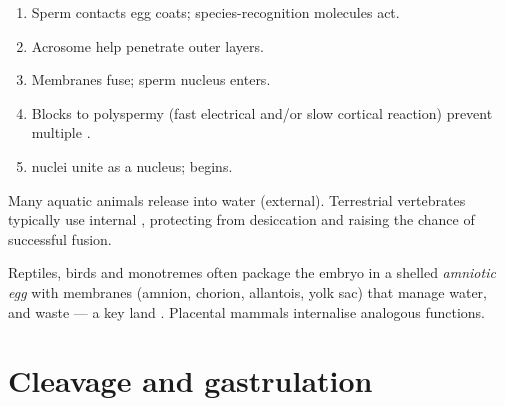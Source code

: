\begin{method}
\label{met:g12:reproduction-development:fert}
\begin{enumerate}
  \item Sperm contacts egg coats; species-recognition molecules act.
  \item Acrosome  help penetrate outer layers.
  \item Membranes fuse; sperm nucleus enters.
  \item Blocks to polyspermy (fast electrical and/or slow cortical
        reaction) prevent multiple .
  \item {} nuclei unite as a   nucleus;  begins.
\end{enumerate}
\end{method}

\begin{example}
\label{ex:g12:reproduction-development:internal}
Many aquatic animals release  into water (external). Terrestrial
vertebrates typically use internal , protecting  from
desiccation and raising the chance of successful fusion.
\end{example}

\begin{definition}
\label{def:g12:reproduction-development:amniote}
Reptiles, birds and monotremes often package the embryo in a shelled
\emph{amniotic egg} with membranes (amnion, chorion,
allantois, yolk sac) that manage water,  and waste --- a key
land . Placental mammals internalise analogous functions.
\end{definition}

\section{Cleavage and gastrulation}

